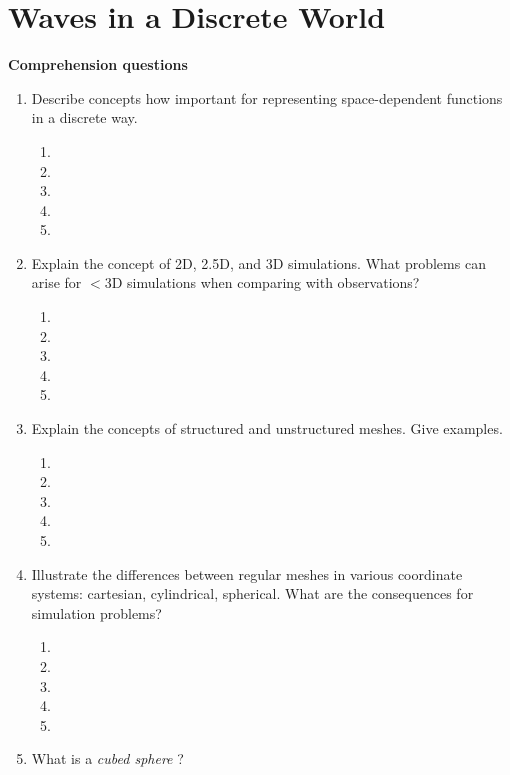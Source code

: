 
\chapter{Waves in a Discrete World}

{\bf Comprehension questions}
\begin{enumerate}
\setcounter{enumi}{0}
\item
Describe concepts how important for representing space-dependent functions in a discrete way. 
\begin{enumerate}
\item[]
\item[]
\item[] 
\item[]
\item[] 
\end{enumerate}
\item
Explain the concept of 2D, 2.5D, and 3D simulations. What problems can arise for $<$3D simulations when comparing with observations?
\begin{enumerate}
\item[]
\item[]
\item[] 
\item[]
\item[] 
\end{enumerate}
\item
Explain the concepts of structured and unstructured meshes.  Give examples. 
\begin{enumerate}
\item[]
\item[]
\item[] 
\item[]
\item[] 
\end{enumerate}
\item
Illustrate the differences between regular meshes in various coordinate systems: cartesian, cylindrical, spherical. What are the consequences for simulation problems?
\begin{enumerate}
\item[]
\item[]
\item[] 
\item[]
\item[] 
\end{enumerate}
\item
What is a {\it cubed sphere} ?
\begin{enumerate}

\end{enumerate}
\end{enumerate}
